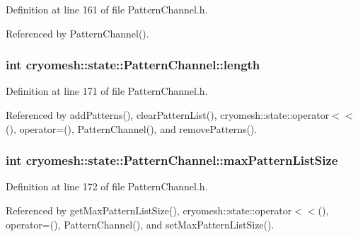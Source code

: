 \-Definition at line 161 of file \-Pattern\-Channel.\-h.



\-Referenced by \-Pattern\-Channel().

\hypertarget{classcryomesh_1_1state_1_1PatternChannel_a979af8e9743379cc8484cfa7348838f2}{
\subsubsection[{length}]{\setlength{\rightskip}{0pt plus 5cm}int {\bf cryomesh\-::state\-::\-Pattern\-Channel\-::length}}}\label{classcryomesh_1_1state_1_1PatternChannel_a979af8e9743379cc8484cfa7348838f2}


\-Definition at line 171 of file \-Pattern\-Channel.\-h.



\-Referenced by add\-Patterns(), clear\-Pattern\-List(), cryomesh\-::state\-::operator$<$$<$(), operator=(), \-Pattern\-Channel(), and remove\-Patterns().

\hypertarget{classcryomesh_1_1state_1_1PatternChannel_aeab8770881ec9be1b48c712a23dd6271}{
\subsubsection[{max\-Pattern\-List\-Size}]{\setlength{\rightskip}{0pt plus 5cm}int {\bf cryomesh\-::state\-::\-Pattern\-Channel\-::max\-Pattern\-List\-Size}}}\label{classcryomesh_1_1state_1_1PatternChannel_aeab8770881ec9be1b48c712a23dd6271}


\-Definition at line 172 of file \-Pattern\-Channel.\-h.



\-Referenced by get\-Max\-Pattern\-List\-Size(), cryomesh\-::state\-::operator$<$$<$(), operator=(), \-Pattern\-Channel(), and set\-Max\-Pattern\-List\-Size().

